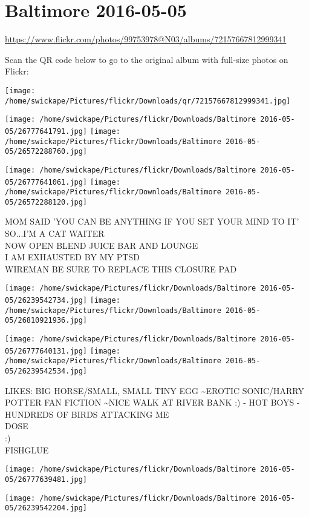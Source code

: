 \documentclass[10pt,letterpaper]{article}
\title{}
\author{}
\date{}
\begin{document}
\section*{Baltimore 2016-05-05}

\url{https://www.flickr.com/photos/99753978@N03/albums/72157667812999341}

Scan the QR code below to go to the original album with full-size photos on Flickr:

\texttt{[image: /home/swickape/Pictures/flickr/Downloads/qr/72157667812999341.jpg]}
\pagebreak

\texttt{[image: /home/swickape/Pictures/flickr/Downloads/Baltimore 2016-05-05/26777641791.jpg]}
\texttt{[image: /home/swickape/Pictures/flickr/Downloads/Baltimore 2016-05-05/26572288760.jpg]}

\texttt{[image: /home/swickape/Pictures/flickr/Downloads/Baltimore 2016-05-05/26777641061.jpg]}
\texttt{[image: /home/swickape/Pictures/flickr/Downloads/Baltimore 2016-05-05/26572288120.jpg]}

MOM SAID 'YOU CAN BE ANYTHING IF YOU SET YOUR MIND TO IT' SO...I'M A CAT WAITER\\
NOW OPEN BLEND JUICE BAR AND LOUNGE\\
I AM EXHAUSTED BY MY PTSD\\
WIREMAN BE SURE TO REPLACE THIS CLOSURE PAD
\pagebreak

\texttt{[image: /home/swickape/Pictures/flickr/Downloads/Baltimore 2016-05-05/26239542734.jpg]}
\texttt{[image: /home/swickape/Pictures/flickr/Downloads/Baltimore 2016-05-05/26810921936.jpg]}

\texttt{[image: /home/swickape/Pictures/flickr/Downloads/Baltimore 2016-05-05/26777640131.jpg]}
\texttt{[image: /home/swickape/Pictures/flickr/Downloads/Baltimore 2016-05-05/26239542534.jpg]}

LIKES: BIG HORSE/SMALL, SMALL TINY EGG \textasciitilde{}EROTIC SONIC/HARRY POTTER FAN FICTION \textasciitilde{}NICE WALK AT RIVER BANK :) {-} HOT BOYS {-} HUNDREDS OF BIRDS ATTACKING ME\\
DOSE\\
:)\\
FISHGLUE
\pagebreak

\texttt{[image: /home/swickape/Pictures/flickr/Downloads/Baltimore 2016-05-05/26777639481.jpg]}

\vspace{0.25in}
\texttt{[image: /home/swickape/Pictures/flickr/Downloads/Baltimore 2016-05-05/26239542204.jpg]}
\end{document}
